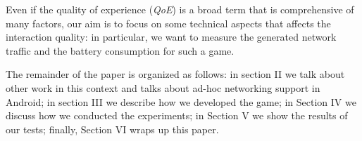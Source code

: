Even if the quality of experience (\textit{QoE}) is a broad term that is
comprehensive of many factors\cite{bib:moeller-qoe}, our aim is to focus on
some technical aspects that affects the interaction quality: in particular, we
want to measure the generated network traffic and the battery consumption for
such a game.

The remainder of the paper is organized as follows: in section II we talk about
other work in this context and talks about ad-hoc networking support in Android;
in section III we describe how we developed the game; in Section IV we discuss
how we conducted the experiments; in Section V we show the results of our tests;
finally, Section VI wraps up this paper.
